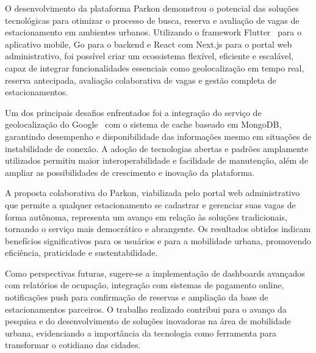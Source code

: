 O desenvolvimento da plataforma Parkon demonstrou o potencial das soluções tecnológicas para otimizar o processo de busca, reserva e avaliação de vagas de estacionamento em ambientes urbanos. Utilizando o framework Flutter~\cite{flutter2025} para o aplicativo mobile, Go para o backend e React com Next.js para o portal web administrativo, foi possível criar um ecossistema flexível, eficiente e escalável, capaz de integrar funcionalidades essenciais como geolocalização em tempo real, reserva antecipada, avaliação colaborativa de vagas e gestão completa de estacionamentos.

Um dos principais desafios enfrentados foi a integração do serviço de geolocalização do Google~\cite{goldstein2025} com o sistema de cache baseado em MongoDB, garantindo desempenho e disponibilidade das informações mesmo em situações de instabilidade de conexão. A adoção de tecnologias abertas e padrões amplamente utilizados permitiu maior interoperabilidade e facilidade de manutenção, além de ampliar as possibilidades de crescimento e inovação da plataforma.

A proposta colaborativa do Parkon, viabilizada pelo portal web administrativo que permite a qualquer estacionamento se cadastrar e gerenciar suas vagas de forma autônoma, representa um avanço em relação às soluções tradicionais, tornando o serviço mais democrático e abrangente. Os resultados obtidos indicam benefícios significativos para os usuários e para a mobilidade urbana, promovendo eficiência, praticidade e sustentabilidade.

Como perspectivas futuras, sugere-se a implementação de dashboards avançados com relatórios de ocupação, integração com sistemas de pagamento online, notificações push para confirmação de reservas e ampliação da base de estacionamentos parceiros. O trabalho realizado contribui para o avanço da pesquisa e do desenvolvimento de soluções inovadoras na área de mobilidade urbana, evidenciando a importância da tecnologia como ferramenta para transformar o cotidiano das cidades.
